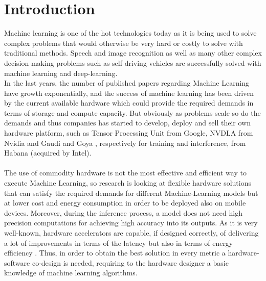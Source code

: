 \chapter{Introduction}
Machine learning is one of the hot technologies today as it is being used to solve complex problems that would otherwise be very hard or costly to solve with traditional methods. Speech and image recognition as well as many other complex decision-making problems such as self-driving vehicles are successfully solved with machine learning and deep-learning.\\
In the last years, the number of published papers regarding Machine Learning have growth exponentially, and the success of machine learning has been driven by the current available hardware which could provide the required demands in terms of storage and compute capacity. But obviously as problems scale so do the demands and thus companies has started to develop, deploy and sell their own hardware platform, such as Tensor Processing Unit \cite{paper:40} from Google, NVDLA\cite{WEBSITE:6} from Nvidia and Gaudi \cite{paper:39} and Goya \cite{paper:38}, respectively for training and interference, from Habana (acquired by Intel). \\\\
The use of commodity hardware is not the most effective and efficient way to execute Machine Learning, so research is looking at flexible hardware solutions \cite{paper:1} \cite{paper:2} that can satisfy the required demands for different Machine-Learning models but at lower cost and energy consumption in order to be deployed also on mobile devices. Moreover, during the inference process, a model does not need high precision computations \cite{paper:8} \cite{paper:15} for achieving high accuracy into its outputs.
As it is very well-known, hardware accelerators are capable, if designed correctly, of delivering a lot of improvements in terms of the latency but also in terms of energy efficiency \cite{paper:29}. Thus, in order to obtain the best solution in every metric a hardware-software co-design is needed, requiring to the hardware designer a basic knowledge of machine learning algorithms.\\\\

